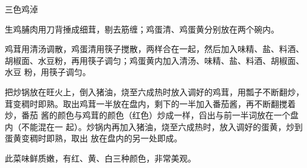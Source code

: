 %
%
%
%
%
%
%
\begin{recipe}{三色鸡淖}

\ingredients


\preparation

\step 生鸡脯肉用刀背捶成细茸，剔去筋缠；鸡蛋清、鸡蛋黄分别放在两个碗内。

\step 鸡茸用清汤调散，鸡蛋清用筷子搅散，两样合在一起，然后加入味精、盐、料酒、
胡椒面、水豆粉，再用筷子调匀；鸡蛋黄内加入清汤、味精、盐、料酒、胡椒面、水豆
粉，用筷子调匀。

\step 把炒锅放在旺火上，倒入猪油，烧至六成热时放入调好的鸡茸，用瓢子不断翻炒，
茸变稠时即熟。取出鸡茸一半放在盘内，剩下的一半加入番茄酱，再不断翻搅着炒，番茄
酱的颜色与鸡茸的颜色（红色）炒成一样，舀出与前一半词放在一个盘内（不能混在一
起）。炒锅内再加入猪油，烧至六成热时，放入调好的蛋黄，炒到蛋黄变稠时即熟，取出
放在盘内的另一处即成。

\features

此菜味鲜质嫩，有红、黄、白三种颜色，非常美观。

\end{recipe}


